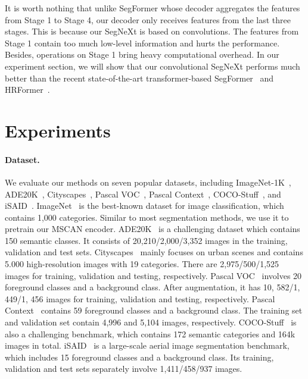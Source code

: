 \documentclass{article}
\begin{document}
It is worth nothing that unlike SegFormer whose decoder aggregates the features from Stage 1 to
Stage 4, our decoder only receives features from the last three stages.
This is because our SegNeXt is based on convolutions.
The features from Stage 1 contain too much low-level 
information and hurts the performance.
Besides, operations on Stage 1 bring heavy computational overhead.
In our experiment section, we will show that our convolutional SegNeXt performs much better than the recent state-of-the-art transformer-based SegFormer~\cite{xie2021segformer} and HRFormer~\cite{yuan2021hrformer}.


\section{Experiments}

\paragraph{Dataset.}
We evaluate our methods on seven popular datasets, including
ImageNet-1K~\cite{deng2009imagenet}, ADE20K~\cite{zhou2017scene}, Cityscapes~\cite{cordts2016cityscapes},
Pascal VOC~\cite{everingham2010pascal}, Pascal Context~\cite{mottaghi2014role}, COCO-Stuff~\cite{caesar2018coco}, and iSAID~\cite{waqas2019isaid}.  
ImageNet~\cite{deng2009imagenet} is the best-known dataset for image classification, 
which contains 1,000 categories.
Similar to most segmentation methods, we use it to pretrain our MSCAN encoder. 
ADE20K~\cite{zhou2017scene} is a challenging dataset which contains 150 semantic classes.
It consists of 20,210/2,000/3,352 images in the training, validation and test sets.
Cityscapes~\cite{cordts2016cityscapes} mainly focuses on urban scenes and 
contains 5.000 high-resolution images with 19 categories.
There are 2,975/500/1,525 images for  training, validation and testing, respectively.
Pascal VOC~\cite{everingham2010pascal} involves 20 foreground classes and a background class.
After augmentation, it has 10, 582/1, 449/1, 456 images for 
training, validation and testing, respectively.
Pascal Context~\cite{mottaghi2014role} contains 59 foreground classes and a background class.
The training set and validation set contain 4,996 and 5,104 images, respectively.
COCO-Stuff~\cite{caesar2018coco} is also a challenging benchmark, which 
contains 172 semantic categories and 164k images in total.
iSAID~\cite{waqas2019isaid} is a large-scale aerial image segmentation benchmark,
which includes 15 foreground classes and a background class.
Its training, validation and test sets separately involve
1,411/458/937 images.
\end{document}
